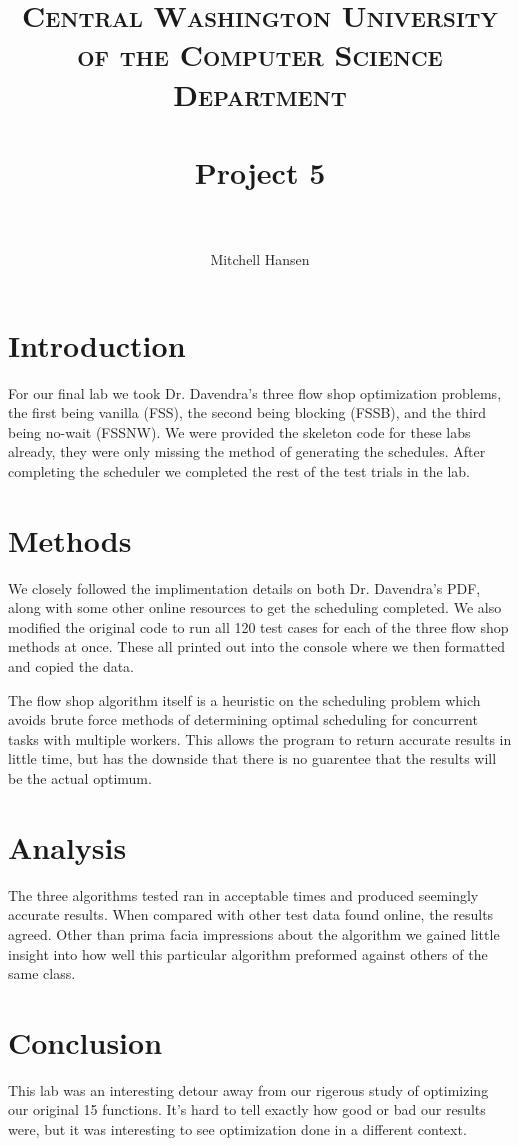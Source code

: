 \documentclass[paper=a4, fontsize=11pt]{scrartcl}
\title{
		\usefont{OT1}{bch}{b}{n}
		\normalfont \normalsize \textsc{Central Washington University of the Computer Science Department} \\ [25pt]
		\horrule{0.5pt} \\[0.4cm]
		\huge Project 5 \\
		\horrule{2pt} \\[0.5cm]
}
\author{\normalsize Mitchell Hansen \\[-6pt]}
\numberwithin{equation}{section}
\numberwithin{figure}{section}
\numberwithin{table}{section}
\begin{document}
\maketitle

\section{Introduction}
For our final lab we took Dr. Davendra's three flow shop optimization problems, the first being vanilla (FSS), the second being blocking (FSSB), and the third being no-wait (FSSNW). We were provided the skeleton code for these labs already, they were only missing the method of generating the schedules. After completing the scheduler we completed the rest of the test trials in the lab.

\section{Methods}
We closely followed the implimentation details on both Dr. Davendra's PDF, along with some other online resources to get the scheduling completed. We also modified the original code to run all 120 test cases for each of the three flow shop methods at once. These all printed out into the console where we then formatted and copied the data.

The flow shop algorithm itself is a heuristic on the scheduling problem which avoids brute force methods of determining optimal scheduling for concurrent tasks with multiple workers. This allows the program to return accurate results in little time, but has the downside that there is no guarentee that the results will be the actual optimum. 

\section{Analysis}

The three algorithms tested ran in acceptable times and produced seemingly accurate results. When compared with other test data found online, the results agreed. Other than prima facia impressions about the algorithm we gained little insight into how well this particular algorithm preformed against others of the same class. 


\section{Conclusion}

This lab was an interesting detour away from our rigerous study of optimizing our original 15 functions. It's hard to tell exactly how good or bad our results were, but it was interesting to see optimization done in a different context.
\end{document}
